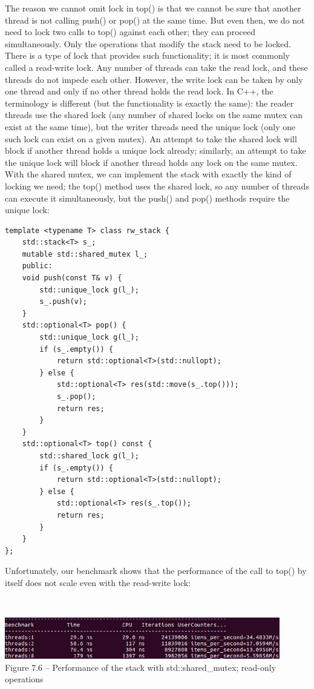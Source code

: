 The reason we cannot omit lock in top() is that we cannot be sure that another thread is not calling push() or pop() at the same time. But even then, we do not need to lock two calls to top() against each other; they can proceed simultaneously. Only the operations that modify the stack need to be locked. There is a type of lock that provides such functionality; it is most commonly called a read-write lock. Any number of threads can take the read lock, and these threads do not impede each other. However, the write lock can be taken by only one thread and only if no other thread holds the read lock. In C++, the terminology is different (but the functionality is exactly the same): the reader threads use the shared lock (any number of shared locks on the same mutex can exist at the same time), but the writer threads need the unique lock (only one such lock can exist on a given mutex). An attempt to take the shared lock will block if another thread holds a unique lock already; similarly, an attempt to take the unique lock will block if another thread holds any lock on the same mutex. With the shared mutex, we can implement the stack with exactly the kind of locking we need; the top() method uses the shared lock, so any number of threads can execute it simultaneously, but the push() and pop() methods require the unique lock:

\begin{lstlisting}[style=styleCXX]
template <typename T> class rw_stack {
	std::stack<T> s_;
	mutable std::shared_mutex l_;
	public:
	void push(const T& v) {
		std::unique_lock g(l_);
		s_.push(v);
	}
	std::optional<T> pop() {
		std::unique_lock g(l_);
		if (s_.empty()) {
			return std::optional<T>(std::nullopt);
		} else {
			std::optional<T> res(std::move(s_.top()));
			s_.pop();
			return res;
		}
	}
	std::optional<T> top() const {
		std::shared_lock g(l_);
		if (s_.empty()) {
			return std::optional<T>(std::nullopt);
		} else {
			std::optional<T> res(s_.top());
			return res;
		}
	}
};
\end{lstlisting}

Unfortunately, our benchmark shows that the performance of the call to top() by itself does not scale even with the read-write lock:

\hspace*{\fill} \\ %
\begin{center}
\includegraphics[width=0.9\textwidth]{content/2/chapter7/images/6.jpg}\\
Figure 7.6 – Performance of the stack with std::shared\_mutex; read-only operations
\end{center}

